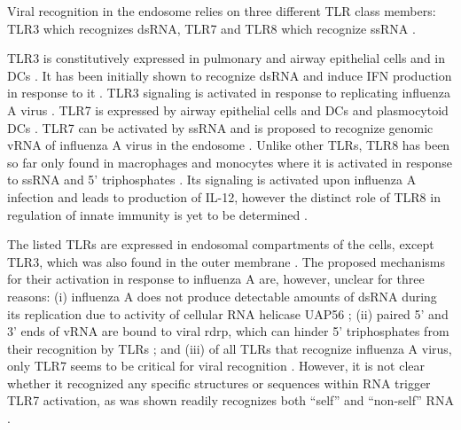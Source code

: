 		Viral recognition in the endosome relies on three different \gls{TLR} class members: \gls{TLR}3 which recognizes dsRNA, \gls{TLR}7 and \gls{TLR}8 which recognize ssRNA \parencite{Iwasaki2014}. 
		
		\gls{TLR}3 is constitutively expressed in pulmonary and airway epithelial  cells and in \glspl{DC} \parencite{Guillot2005, Schulz2005, Ioannidis2013}. It has been initially shown to recognize dsRNA and induce \gls{IFN} production in response to it \parencite{Alexopoulou2001, Guillot2005}. \gls{TLR}3 signaling is activated in response to replicating influenza A virus \parencite{Guillot2005}. 	\gls{TLR}7 is expressed by airway epithelial cells and \gls{DC}s and plasmocytoid \gls{DC}s \parencite{Ioannidis2013, Lund2004}. \gls{TLR}7 can be activated by \gls{ssRNA} and is proposed to recognize genomic vRNA of influenza A virus in the endosome \parencite{Diebold2004}. Unlike other \glspl{TLR}, \gls{TLR}8 has been so far only found in macrophages and monocytes where it is activated in response to \gls{ssRNA} and 5' triphosphates \parencite{Ablasser2009}. Its signaling is activated upon influenza A infection and leads to production of \gls{IL}-12, however the distinct role of \gls{TLR}8 in regulation of innate immunity is yet to be determined \parencite{Lee2013a}.
		
		
		The listed \gls{TLR}s are expressed in endosomal compartments of the cells, except \gls{TLR}3, which was also found in the outer membrane \parencite{Schulz2005, Ablasser2009, Diebold2004}. The proposed mechanisms for their activation in response to influenza A are, however, unclear for three reasons: (i) influenza A does not produce detectable amounts of dsRNA during its replication due to activity of cellular RNA helicase UAP56 \parencite{Wisskirchen2011}; (ii) paired 5' and 3' ends of vRNA are bound to viral \gls{rdrp}, which can hinder 5' triphosphates from their recognition by \glspl{TLR} \parencite{Arranz2012}; and (iii) of all \glspl{TLR} that recognize influenza A virus, only \gls{TLR}7 seems to be critical for viral recognition \parencite{Lund2004}. However, it is not clear whether it recognized any specific structures or sequences within RNA trigger \gls{TLR}7 activation, as  was shown readily recognizes both ``self'' and ``non-self'' RNA \parencite{Diebold2004}.
		
